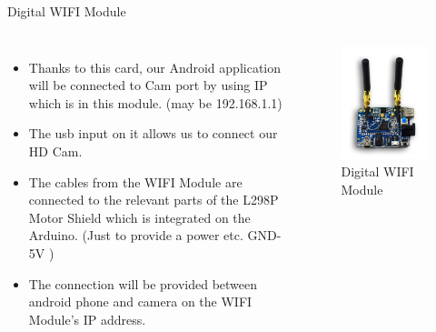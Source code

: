 \documentclass[xcolor=table, 9pt]{beamer}
\begin{document}


\begin{frame}{Digital WIFI Module}
\begin{columns}[c] 
\begin{itemize}
\item Thanks to this card, our Android application will be connected to Cam port by using IP which is in this module. (may be 192.168.1.1)
\item The usb input on it allows us to connect our HD Cam.
\item The cables from the WIFI Module are connected to the relevant parts of the L298P Motor Shield which is integrated on the Arduino. (Just to provide a power etc. GND-5V )
\item The connection will be provided between android phone and camera on the WIFI Module's IP address.
\end{itemize}
\begin{figure}
\includegraphics[width=1\linewidth]{wifi.png}
\caption{Digital WIFI Module}
\end{figure}
\end{columns}
\end{frame}
\end{document}
